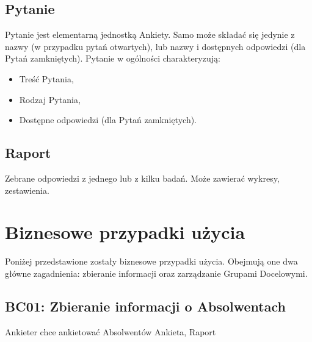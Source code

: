 \subsection{Pytanie}
\label{Chapter225}

Pytanie jest elementarną jednostką Ankiety. Samo może składać się jedynie z nazwy (w przypadku pytań otwartych), lub nazwy i dostępnych odpowiedzi (dla Pytań zamkniętych). Pytanie w ogólności charakteryzują:

\begin{itemize}
\item Treść Pytania,
\item Rodzaj Pytania,
\item Dostępne odpowiedzi (dla Pytań zamkniętych).
\end{itemize}

\subsection{Raport}
\label{Chapter226}

Zebrane odpowiedzi z jednego lub z kilku badań. Może zawierać wykresy, zestawienia.

\pagebreak
\section{Biznesowe przypadki użycia}
\label{Chapter23}

Poniżej przedstawione zostały biznesowe przypadki użycia. Obejmują one dwa główne zagadnienia: zbieranie informacji oraz zarządzanie Grupami Docelowymi.

\subsection{BC01: Zbieranie informacji o Absolwentach}
\label{Chapter231}

{Ankieter chce ankietować Absolwentów}
{Ankieta, Raport}{}
{}

